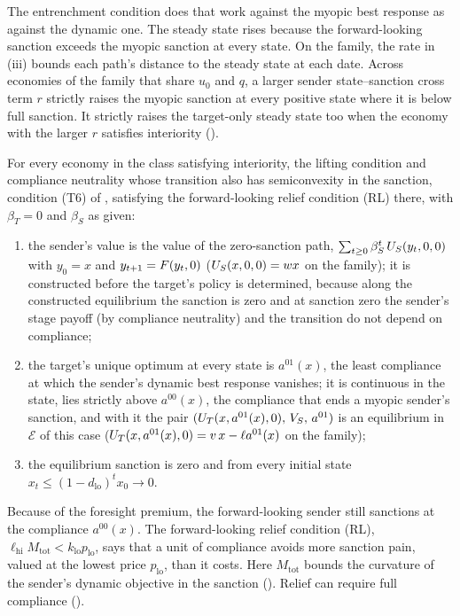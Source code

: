  The entrenchment condition does that work against the
myopic best response as against the dynamic one. The steady state rises
because the forward-looking sanction exceeds the myopic sanction at every
state. On the family, the rate in (iii) bounds each path's distance to the
steady state at each date. Across economies of the family that share $u_0$ and
$q$, a larger sender state--sanction cross term $r$ strictly raises the myopic
sanction at every positive state where it is below full sanction. It strictly raises the target-only steady
state too when the economy with the larger $r$ satisfies interiority
().

\begin{proposition}
\label{prop:sender-only}
For every economy in the class satisfying interiority, the lifting condition and
compliance neutrality whose transition also has
semiconvexity in the sanction, condition \textup{(T6)} of
, satisfying
the forward-looking relief condition \textup{(RL)} there, with $\beta_T=0$ and $\beta_S$ as
given:
\begin{enumerate}[label=(\roman*)]
\item the sender's value is the value of the zero-sanction path,
$\sum_{t\ge0}\beta_S^t\,U_S(y_t,0,0)$ with $y_0=x$ and $y_{t+1}=F(y_t,0)$
($U_S(x,0,0)=wx$ on the
family); it is constructed before
the target's policy is determined, because along the constructed equilibrium
the sanction is zero and at sanction zero the sender's stage payoff
(by compliance neutrality) and the transition do not depend on compliance;
\item the target's unique optimum at every state is
$a^{01}(x)$, the least compliance at which the sender's dynamic best
response vanishes; it is continuous in the state, lies strictly above
$a^{00}(x)$, the compliance that ends a myopic sender's sanction, and with it the pair
$(U_T(x,a^{01}(x),0),\,V_S,\,a^{01})$ is an equilibrium in $\mathcal E$ of this
case ($U_T(x,a^{01}(x),0)=v\,x-\ell a^{01}(x)$ on the family);
\item the equilibrium sanction is zero and from every initial state
$x_t\le(1-d_{\mathrm{lo}})^tx_0\to0$.
\end{enumerate}
\end{proposition}

 Because of the
foresight premium, the forward-looking sender still sanctions at the compliance
$a^{00}(x)$. The forward-looking relief condition (RL),
$\ell_{\mathrm{hi}}M_{\mathrm{tot}}<k_{\mathrm{lo}}p_{\mathrm{lo}}$, says that a unit of compliance
avoids more sanction pain, valued at the lowest price $p_{\mathrm{lo}}$, than it
costs. Here $M_{\mathrm{tot}}$ bounds the curvature of the sender's dynamic objective
in the sanction (). Relief can require
full compliance ().

